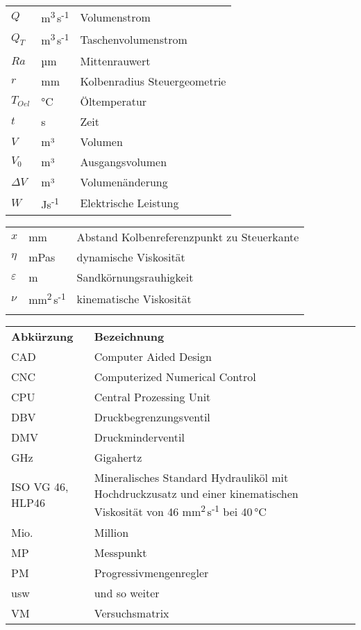 \begin{tabular}{p{40mm} p{30mm} p{73mm}}
$Q$&m\textsuperscript{3}\,s\textsuperscript{-1}&Volumenstrom\\
$Q_T$&m\textsuperscript{3}\,s\textsuperscript{-1}&Taschenvolumenstrom\\
$Ra$&µm&Mittenrauwert\\
$r$&mm&Kolbenradius Steuergeometrie\\
$T_{Oel}$&°C&Öltemperatur\\
$t$&s&Zeit\\
$V$&m³&Volumen\\
$V_0$&m³&Ausgangsvolumen\\
$\Delta{V}$&m³&Volumenänderung\\
$W$&Js\textsuperscript{-1}&Elektrische Leistung\\
\end{tabular}
\newpage
\begin{tabular}{p{40mm} p{30mm} p{73mm}}
$x$&mm&Abstand Kolbenreferenzpunkt zu Steuerkante\\
$\eta$&mPas&dynamische Viskosität\\
$\varepsilon$&m&Sandkörnungsrauhigkeit\\
$\nu$&mm\textsuperscript{2}\,s\textsuperscript{-1}&kinematische Viskosität\\
\vspace{1 cm}
\end{tabular}

\pagestyle{scrheadings}
\begin{tabular}{p{40mm} p{110mm}}
\bfseries Abkürzung & \bfseries Bezeichnung\\
CAD&Computer Aided Design\\
CNC&Computerized Numerical Control\\
CPU&Central Prozessing Unit\\
DBV&Druckbegrenzungsventil\\
DMV&Druckminderventil\\
GHz&Gigahertz\\
ISO VG 46, HLP46&Mineralisches Standard Hydrauliköl mit Hochdruckzusatz und einer kinematischen Viskosität von 46 mm\textsuperscript{2}\,s\textsuperscript{-1} bei 40\,°C\\
Mio.&Million\\
MP&Messpunkt\\
PM&Progressivmengenregler\\
usw&und so weiter\\
VM&Versuchsmatrix\\
\end{tabular}